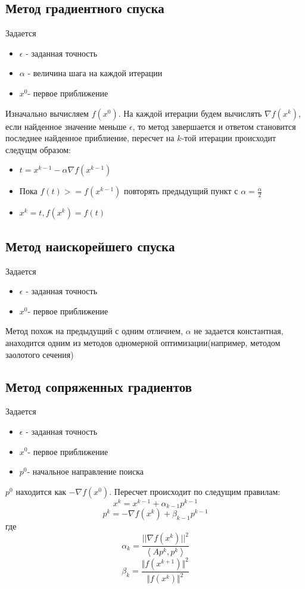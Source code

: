 \documentclass[a4paper, 14pt]{article}
\begin{document}
		
		\subsection*{Метод градиентного спуска}
		Задается
		\begin{itemize}
			\item $\epsilon$ - заданная точность
			\item $\alpha$ - величина шага на каждой итерации 
			\item $x^0$- первое приближение
		\end{itemize}
		Изначально вычисляем $f(x^0)$. На каждой итерации будем вычислять $\nabla f(x^k)$, если найденное значение меньше  $\epsilon$, то метод завершается и ответом становится последнее найденное приблиение, пересчет на $k$-той итерации происходит следущм образом:
		\begin{itemize}
			\item $t = x^{k-1} - \alpha \nabla f(x^{k-1})$
			\item Пока $f(t) >= f(x^{k-1}) $ повторять предыдущий пункт с $\alpha = \frac{\alpha}{2}$
			\item $x^k = t, f(x^k) = f(t)$
		\end{itemize}
		
		\subsection*{Метод наискорейшего спуска}
		Задается
		\begin{itemize}
			\item $\epsilon$ - заданная точность
			\item $x^0$- первое приближение
		\end{itemize}
		Метод похож на предыдущий с одним отличием, $\alpha$ не задается константная, анаходится одним из методов одномерной оптимизации(например, методом заолотого сечения)
		
		\subsection*{Метод сопряженных градиентов}
		Задается
		\begin{itemize}
			\item $\epsilon$ - заданная точность
			\item $x^0$- первое приближение
			\item $p^0$- начальное направление поиска
		\end{itemize}
		$p^0$ находится как $-\nabla f(x^0)$. Пересчет происходит по следущим правилам:
		\[x^k = x^{k -1} + \alpha_{k-1}p^{k-1}\]
		\[p^k = -\nabla f(x^{k}) + \beta_{k - 1}p^{k - 1}\]
		где 
		\[\alpha_k = \frac{||\nabla f(x^{k})||^2}{\left\langle Ap^k, p^k\right\rangle}\]
		\[\beta_k = \frac{\Vert f(x^{k + 1})\Vert^2}{\Vert f(x^k)\Vert^2}\]
		
\end{document}

